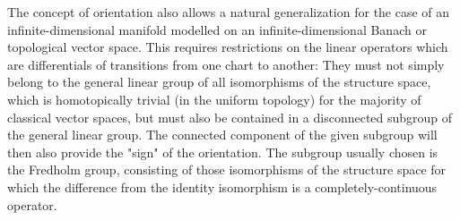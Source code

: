 The concept of orientation also allows a natural generalization for the case of an infinite-dimensional manifold modelled on an infinite-dimensional Banach or topological vector space. This requires restrictions on the linear operators which are differentials of transitions from one chart to another: They must not simply belong to the general linear group of all isomorphisms of the structure space, which is homotopically trivial (in the uniform topology) for the majority of classical vector spaces, but must also be contained in a disconnected subgroup of the general linear group. The connected component of the given subgroup will then also provide the "sign" of the orientation. The subgroup usually chosen is the Fredholm group, consisting of those isomorphisms of the structure space for which the difference from the identity isomorphism is a completely-continuous operator.


















